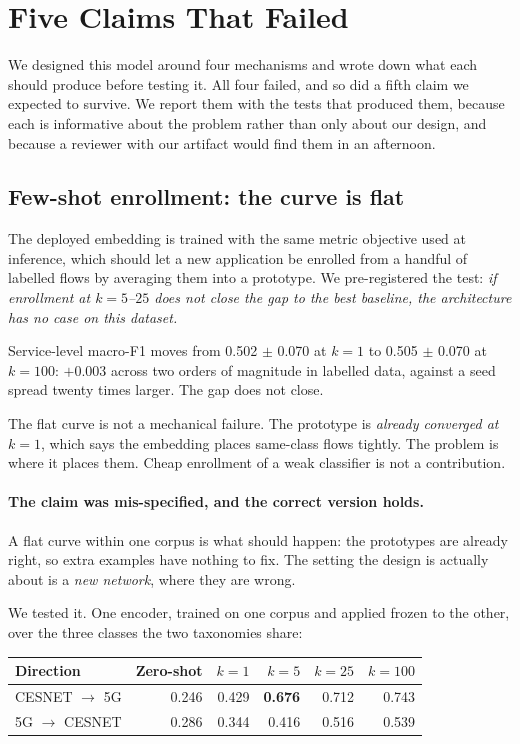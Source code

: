 \section{Five Claims That Failed}
\label{sec:negative}

We designed this model around four mechanisms and wrote down what each should
produce before testing it. All four failed, and so did a fifth claim we
expected to survive. We report them with the tests that produced them, because
each is informative about the problem rather than only about our design, and
because a reviewer with our artifact would find them in an afternoon.

\subsection{Few-shot enrollment: the curve is flat}

The deployed embedding is trained with the same metric objective used at
inference, which should let a new application be enrolled from a handful of
labelled flows by averaging them into a prototype. We pre-registered the test:
\emph{if enrollment at $k = 5$--$25$ does not close the gap to the best
baseline, the architecture has no case on this dataset.}

Service-level macro-F1 moves from 0.502 $\pm$ 0.070 at $k=1$ to 0.505 $\pm$
0.070 at $k=100$: $+0.003$ across two orders of magnitude in labelled data,
against a seed spread twenty times larger. The gap does not close.

The flat curve is not a mechanical failure. The prototype is \emph{already
converged at $k=1$}, which says the embedding places same-class flows tightly.
The problem is where it places them. Cheap enrollment of a weak classifier is
not a contribution.

\paragraph{The claim was mis-specified, and the correct version holds.} A flat
curve within one corpus is what should happen: the prototypes are already
right, so extra examples have nothing to fix. The setting the design is
actually about is a \emph{new network}, where they are wrong.

We tested it. One encoder, trained on one corpus and applied frozen to the
other, over the three classes the two taxonomies share:

\begin{center}
\small
\begin{tabular}{lrrrrr}
\toprule
Direction & Zero-shot & $k=1$ & $k=5$ & $k=25$ & $k=100$ \\
\midrule
CESNET $\rightarrow$ 5G & 0.246 & 0.429 & \textbf{0.676} & 0.712 & 0.743 \\
5G $\rightarrow$ CESNET & 0.286 & 0.344 & 0.416 & 0.516 & 0.539 \\
\bottomrule
\end{tabular}
\end{center}


